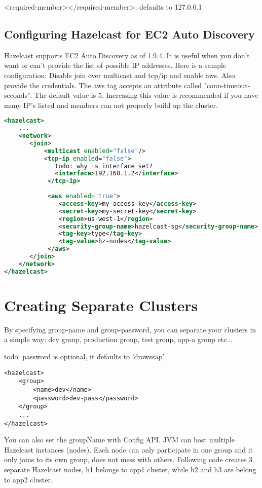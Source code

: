 <required-member></required-member>: defaults to 127.0.0.1


\subsection{Configuring Hazelcast for EC2 Auto Discovery}

Hazelcast supports EC2 Auto Discovery as of 1.9.4. It is useful when you don't want or can't provide the list of possible IP addresses. Here is a sample configuration: Disable join over multicast and tcp/ip and enable aws. Also provide the credentials. The aws tag accepts an attribute called "conn-timeout-seconds". The default value is 5. Increasing this value is recommended if you have many IP's listed and members can not properly build up the cluster.

\begin{lstlisting}[language=xml]
<hazelcast>
    ...
    <network>
       <join>
           <multicast enabled="false"/>
           <tcp-ip enabled="false">
              todo: why is interface set?
              <interface>192.168.1.2</interface>
            </tcp-ip>
    
            <aws enabled="true">
               <access-key>my-access-key</access-key>
               <secret-key>my-secret-key</secret-key>
               <region>us-west-1</region>                              <!-- optional, default is us-east-1 -->
               <security-group-name>hazelcast-sg</security-group-name> <!-- optional -->
               <tag-key>type</tag-key>                                  <!-- optional -->
               <tag-value>hz-nodes</tag-value>                          <!-- optional -->
            </aws>
       </join>
    </network>
</hazelcast>
\end{lstlisting}

\section{Creating Separate Clusters}

By specifying group-name and group-password, you can separate your clusters in a simple way; dev group, production group, test group, app-a group etc... 

todo: password is optional, it defaults to 'drowssap'

\begin{verbatim}
<hazelcast>
    <group>
        <name>dev</name>
        <password>dev-pass</password>
    </group>
    ...
</hazelcast>
\end{verbatim}
You can also set the groupName with Config API. JVM can host multiple Hazelcast instances (nodes). Each node can only participate in one group and it only joins to its own group, does not mess with others. Following code creates 3 separate Hazelcast nodes, h1 belongs to app1 cluster, while h2 and h3 are belong to app2 cluster.

